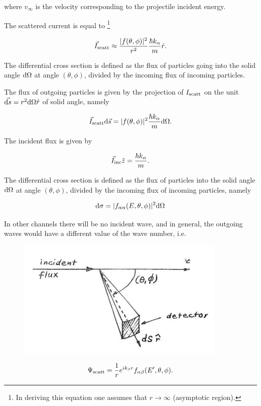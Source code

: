 \noindent where $v_{\infty}$ is the velocity corresponding to the projectile incident energy.

The scattered current is equal to \footnote{In deriving this equation one assumes that $r \rightarrow \infty$ (asymptotic region).}

\begin{equation}
\vec{I}_{\rm scatt} \approx \frac{|f(\theta,\phi)|^2}{r^2} \frac{\hbar k_{\alpha}}{m} \hat{r}.
\end{equation}

The differential cross section is defined as the flux of particles going into the solid angle ${\rm d}\Omega$ at angle $(\theta,\phi)$, divided by the incoming flux of incoming particles.

The flux of outgoing particles is given by the projection of $I_{\rm scatt}$ on the unit $\vec{{\rm d}s} = r^2 {\rm d}\Omega \hat{r}$ of solid angle, namely

\begin{equation}
\vec{I}_{\rm scatt} {\rm d}\vec{s} = |f(\theta,\phi)|^2 \frac{\hbar k_{\alpha}}{m} {\rm d}\Omega.
\end{equation}

\noindent The incident flux is given by

\begin{equation}
\vec{I}_{\rm inc} \hat{z} = \frac{\hbar k_{\alpha}}{m}.
\end{equation}

\noindent The differential cross section is defined as the flux of particles into the solid angle ${\rm d}\Omega$ at angle $(\theta,\phi)$, divided by the incoming flux of incoming particles, namely

\begin{equation}
{\rm d}\sigma = |f_{\alpha \alpha}(E,\theta,\phi)|^2 {\rm d}\Omega
\end{equation}

In other channels there will be no incident wave, and in general, the outgoing waves would have a different value of the wave number, i.e.

\begin{figure}
\centerline{\includegraphics*[width=10cm,angle=0]{C2/figs_C2/1_2.pdf}}
\caption{}\label{fig1st_2}
\end{figure}
\begin{equation}
\Psi_{\rm scatt} = \frac{1}{r} e^{i k_{\beta} r} f_{\alpha \beta} (E',\theta,\phi).
\end{equation}

